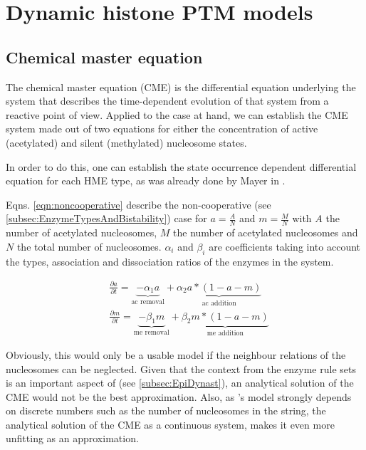     \section{Dynamic histone PTM models}
        \subsection{Chemical master equation}
        \label{subsec:CME}
            The chemical master equation (CME) is the differential equation underlying the system that describes the time-dependent evolution of that system from a reactive point of view. Applied to the case at hand, we can establish the CME system made out of two equations for either the concentration of active (acetylated) and silent (methylated) nucleosome states.

            In order to do this, one can establish the state occurrence dependent differential equation \cite{lemons1908paper} for each HME type, as was already done by Mayer in \cite{mayer2020langevin}. %

            Eqns. \ref{eqn:noncooperative} describe the non-cooperative (see \ref{subsec:EnzymeTypesAndBistability}) case for $a = \frac{A}{N}$ and $m = \frac{M}{N}$ with $A$ the number of acetylated nucleosomes, $M$ the number of acetylated nucleosomes and $N$ the total number of nucleosomes. $\alpha_i$ and $\beta_i$ are coefficients taking into account the types, association and dissociation ratios of the enzymes in the system.

            \begin{subequations}
                \begin{align}
                    &\frac{\partial a}{\partial t} = \underbrace{- \alpha_1 a }_{\textrm{ac removal}} + \underbrace{ \alpha_2 a*(1-a-m) }_{\textrm{ac addition}}\\
                    &\frac{\partial m}{\partial t} = \underbrace{- \beta_1 m }_{\textrm{me removal}} + \underbrace{ \beta_2 m*(1-a-m) }_{\textrm{me addition}}
                \end{align}
                \label{eqn:noncooperative}
            \end{subequations}

            Obviously, this would only be a usable model if the neighbour relations of the nucleosomes can be neglected. Given that the context from the enzyme rule sets is an important aspect of \ed (see \ref{subsec:EpiDynast}), an analytical solution of the CME would not be the best approximation. Also, as \ed's model strongly depends on discrete numbers such as the number of nucleosomes in the string, the analytical solution of the CME as a continuous system, makes it even more unfitting as an approximation.

